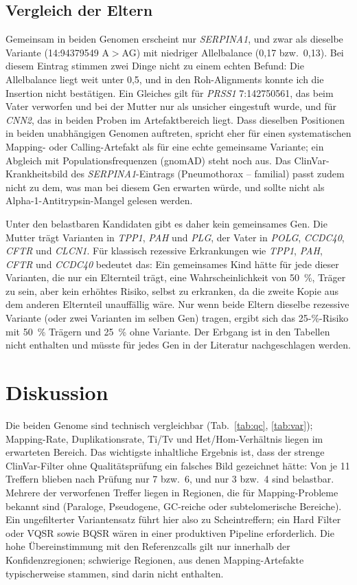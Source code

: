 \documentclass[10pt,a4paper,twocolumn]{article}
\newcommand{\gene}[1]{\textit{#1}}
\begin{document}
\subsection{Vergleich der Eltern}
Gemeinsam in beiden Genomen erscheint nur \gene{SERPINA1}, und zwar als dieselbe Variante (14:94379549 A$>$AG) mit niedriger Allelbalance (0,17 bzw.\ 0,13). Bei diesem Eintrag stimmen zwei Dinge nicht zu einem echten Befund: Die Allelbalance liegt weit unter 0,5, und in den Roh-Alignments konnte ich die Insertion nicht best\"atigen. Ein Gleiches gilt f\"ur \gene{PRSS1} 7:142750561, das beim Vater verworfen und bei der Mutter nur als unsicher eingestuft wurde, und f\"ur \gene{CNN2}, das in beiden Proben im Artefaktbereich liegt. Dass dieselben Positionen in beiden unabh\"angigen Genomen auftreten, spricht eher f\"ur einen systematischen Mapping- oder Calling-Artefakt als f\"ur eine echte gemeinsame Variante; ein Abgleich mit Populationsfrequenzen (gnomAD) steht noch aus. Das ClinVar-Krankheitsbild des \gene{SERPINA1}-Eintrags (Pneumothorax -- familial) passt zudem nicht zu dem, was man bei diesem Gen erwarten w\"urde, und sollte nicht als Alpha-1-Antitrypsin-Mangel gelesen werden.

Unter den belastbaren Kandidaten gibt es daher kein gemeinsames Gen. Die Mutter tr\"agt Varianten in \gene{TPP1}, \gene{PAH} und \gene{PLG}, der Vater in \gene{POLG}, \gene{CCDC40}, \gene{CFTR} und \gene{CLCN1}. F\"ur klassisch rezessive Erkrankungen wie \gene{TPP1}, \gene{PAH}, \gene{CFTR} und \gene{CCDC40} bedeutet das: Ein gemeinsames Kind h\"atte f\"ur jede dieser Varianten, die nur ein Elternteil tr\"agt, eine Wahrscheinlichkeit von 50~\%, Tr\"ager zu sein, aber kein erh\"ohtes Risiko, selbst zu erkranken, da die zweite Kopie aus dem anderen Elternteil unauff\"allig w\"are. Nur wenn beide Eltern dieselbe rezessive Variante (oder zwei Varianten im selben Gen) tragen, ergibt sich das 25-\%-Risiko mit 50~\% Tr\"agern und 25~\% ohne Variante. Der Erbgang ist in den Tabellen nicht enthalten und m\"usste f\"ur jedes Gen in der Literatur nachgeschlagen werden.

\section{Diskussion}
Die beiden Genome sind technisch vergleichbar (Tab.~\ref{tab:qc}, \ref{tab:var}); Mapping-Rate, Duplikationsrate, Ti/Tv und Het/Hom-Verh\"altnis liegen im erwarteten Bereich. Das wichtigste inhaltliche Ergebnis ist, dass der strenge ClinVar-Filter ohne Qualit\"atspr\"ufung ein falsches Bild gezeichnet h\"atte: Von je 11 Treffern blieben nach Pr\"ufung nur 7 bzw.\ 6, und nur 3 bzw.\ 4 sind belastbar. Mehrere der verworfenen Treffer liegen in Regionen, die f\"ur Mapping-Probleme bekannt sind (Paraloge, Pseudogene, GC-reiche oder subtelomerische Bereiche). Ein ungefilterter Variantensatz f\"uhrt hier also zu Scheintreffern; ein Hard Filter oder VQSR sowie BQSR w\"aren in einer produktiven Pipeline erforderlich. Die hohe \"Ubereinstimmung mit den Referenzcalls gilt nur innerhalb der Konfidenzregionen; schwierige Regionen, aus denen Mapping-Artefakte typischerweise stammen, sind darin nicht enthalten.
\end{document}
